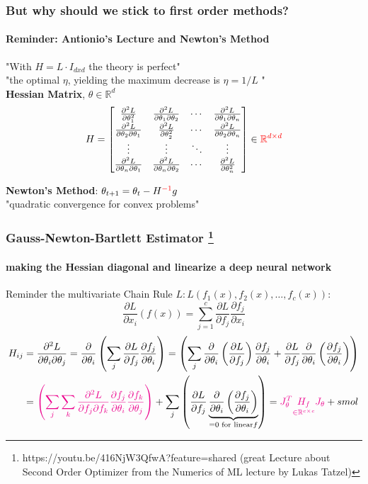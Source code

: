 \documentclass[
	11pt, %
	aspectratio=169, %
]{beamer}
\begin{document}
\begin{frame}
	\frametitle{But why should we stick to first order methods?}
	\framesubtitle{Reminder: Antionio's Lecture and Newton's Method}
		"With $H= L \cdot I_{dxd}$ the theory is perfect" \\
		"the optimal $\eta$, yielding the maximum decrease is $\eta = 1/L$ "\\
		\vspace{1em}
		\textbf{{Hessian Matrix}}, $\theta \in \mathbb{R}^d$
\[
H = \begin{bmatrix}
\frac{\partial^2 L}{\partial \theta_1^2} & \frac{\partial^2 L}{\partial \theta_1 \partial \theta_2} & \cdots & \frac{\partial^2 L}{\partial \theta_1 \partial \theta_n} \\
\frac{\partial^2 L}{\partial \theta_2 \partial \theta_1} & \frac{\partial^2 L}{\partial \theta_2^2} & \cdots & \frac{\partial^2 L}{\partial \theta_2 \partial \theta_n} \\
\vdots & \vdots & \ddots & \vdots \\
\frac{\partial^2 L}{\partial \theta_n \partial \theta_1} & \frac{\partial^2 L}{\partial \theta_n \partial \theta_2} & \cdots & \frac{\partial^2 L}{\partial \theta_n^2}
\end{bmatrix} \in \textcolor{red}{\mathbb{R}^{d\times d}}
\]

		\textbf{Newton's Method}: $\theta_{t+1} = \theta_t - H^{\textcolor{red}{-1}} g$\\
		"quadratic convergence for convex problems"

\end{frame}

\begin{frame}
	\frametitle{Gauss-Newton-Bartlett Estimator \footnote{https://youtu.be/416NjW3QfwA?feature=shared (great Lecture about Second Order Optimizer from the Numerics of ML lecture by Lukas Tatzel)}}
	\framesubtitle{making the Hessian diagonal and linearize a deep neural network}
	Reminder the multivariate Chain Rule $L: L(f_1(x), f_2(x), \dots, f_c(x))$:\[
\frac{\partial L}{\partial x_i}(f(x)) = \sum_{j=1}^c \frac{\partial L}{\partial f_j} \frac{\partial f_j}{\partial x_i}
\]
				 \begin{align*}
					H_{ij} &= \frac{\partial^2 L}{\partial \theta_i \partial \theta_j} =\frac{\partial}{\partial \theta_i }\left( \sum_j \frac{\partial L}{\partial f_j} \frac{\partial f_j}{\partial \theta_i}  \right) 
				 =\left( \sum_j \frac{\partial}{\partial \theta_i } \left(\frac{\partial L}{\partial f_j}\right) \frac{\partial f_j}{\partial \theta_i} +    \frac{\partial L}{\partial f_j} \frac{\partial}{\partial \theta_i }\left( \frac{\partial f_j}{\partial \theta_i}\right) \right) \\
				 &=\textcolor{magenta}{\left( \sum_j \sum_k \frac{\partial^2 L }{\partial f_j \partial f_k }  \frac{\partial f_j}{\partial \theta_i} \frac{\partial f_k}{\partial \theta_j}\right)}+ \sum_j \left(  \frac{\partial L}{\partial f_j} \underbrace{\frac{\partial}{\partial \theta_i }\left( \frac{\partial f_j}{\partial \theta_i}\right)}_{=0 \text{ for linear}f} \right)  = \textcolor{magenta}{J_\theta^T \underset{\in \mathbb{R}^{c\times c}}{H_f} J_\theta} +  smol
				 \end{align*}
\end{frame}
 
\end{document}
